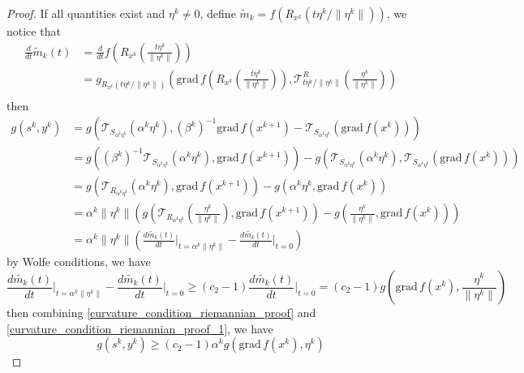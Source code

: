\documentclass[12pt,a4paper,draft]{article}  %
\theoremstyle{definition}
\numberwithin{equation}{section}
\newcommand{\grad}{\mathrm{grad}\,}
\newcommand{\VT}{\mathcal{T}}
\begin{document}
\begin{proof}
        If all quantities exist and $\eta^k\neq 0$, define $\widetilde{m}_k = f\left(R_{x^k}(t\eta^k/\|\eta^k\|)\right)$, we notice that
        \begin{equation}\label{differentiation_of_curve_along_retraction}
        \begin{aligned}
        \frac{d}{dt}\widetilde{m}_k(t) &= \frac{d}{dt}f\left(R_{x^k}\left(\frac{t\eta^k}{\|\eta^k\|}\right)\right)\\
        &= g_{R_{x^k}(t\eta^k/\|\eta^k\|)}\left(\grad f\left(R_{x^k}\left(\frac{t\eta^k}{\|\eta^k\|}\right)\right), \VT^R_{t\eta^k/\|\eta^k\|}\left(\frac{\eta^k}{\|\eta^k\|}\right)\right)\\
        \end{aligned}
        \end{equation}
        then
        \begin{equation}\label{curvature_condition_riemannian_proof}
                \begin{aligned}
                        g(s^k,y^k) &=g\left(\VT_{S_{\alpha^k\eta^k}}(\alpha^k\eta^k), (\beta^k)^{-1}\grad f(x^{k+1}) - \VT_{S_{\alpha^k\eta^k}}(\grad f(x^k))\right)\\
                        &= g\left((\beta^k)^{-1}\VT_{S_{\alpha^k\eta^k}}(\alpha^k\eta^k), \grad f(x^{k+1})\right) - g\left(\VT_{S_{\alpha^k\eta^k}}(\alpha^k\eta^k), \VT_{S_{\alpha^k\eta^k}}(\grad f(x^k))\right)\\
                        &= g\left(\VT_{R_{\alpha^k\eta^k}}(\alpha^k\eta^k), \grad f(x^{k+1})\right) - g\left(\alpha^k\eta^k, \grad f(x^k)\right)\\
                        &= \alpha^k\|\eta^k\|\left(g(\VT_{R_{\alpha^k\eta^k}}(\frac{\eta^k}{\|\eta^k\|}), \grad f(x^{k+1})) - g\left(\frac{\eta^k}{\|\eta^k\|}, \grad f(x^k)\right)\right)\\
                        &= \alpha^k\|\eta^k\|\left(\frac{d\widetilde{m_k}(t)}{dt}\Big|_{t=\alpha^k\|\eta^k\|} - \frac{d\widetilde{m_k}(t)}{dt}\Big|_{t=0}\right)
                \end{aligned}
        \end{equation}
        by Wolfe conditions, we have
        \begin{equation}\label{curvature_condition_riemannian_proof_1}
               \frac{d\widetilde{m_k}(t)}{dt}\Big|_{t=\alpha^k\|\eta^k\|} - \frac{d\widetilde{m_k}(t)}{dt}\Big|_{t=0}\geq(c_2-1)\frac{d\widetilde{m_k}(t)}{dt}\Big|_{t=0} = (c_2-1)g\left(\grad f(x^k), \frac{\eta^k}{\|\eta^k\|}\right)
        \end{equation}
        then combining \eqref{curvature_condition_riemannian_proof} and \eqref{curvature_condition_riemannian_proof_1}, we have
        \begin{equation}\label{curvature_condition_riemannian_proof_2}
                g(s^k,y^k) \geq (c_2-1)\alpha^k g(\grad f(x^k), \eta^k)
        \end{equation}


\end{proof}
\end{document}
